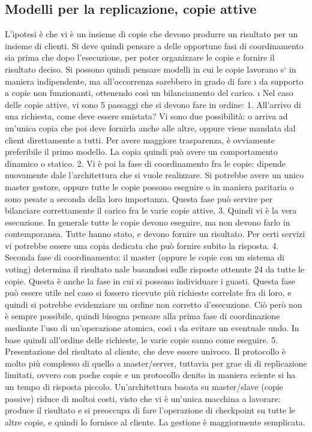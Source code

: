 \subsection{Modelli per la replicazione, copie attive}
L'ipotesi è che vi è un insieme di copie che devono produrre un risultato per
un insieme di clienti. Si deve quindi pensare a delle opportune fasi di coordinamento sia prima che dopo l'esecuzione,
per poter organizzare le copie e
fornire il risultato deciso. Si possono quindi pensare modelli in cui le copie lavorano s` in maniera indipendente, ma
all'occorrenza sarebbero in grado di fare
\i{}
da supporto a copie non funzionanti, ottenendo così un bilanciamento del carico.
\i{}
Nel caso delle copie attive, vi sono 5 passaggi che si devono fare in ordine:
1. All'arrivo di una richiesta, come deve essere smistata? Vi sono due possibilità: o arriva ad un'unica copia che poi
deve fornirla anche alle altre,
oppure viene mandata dal client direttamente a tutti. Per avere maggiore
trasparenza, è ovviamente preferibile il primo modello. La copia quindi
può avere un comportamento dinamico o statico.
2. Vi è poi la fase di coordinamento fra le copie: dipende nuovamente dale
l'architettura che si vuole realizzare. Si potrebbe avere un unico master
gestore, oppure tutte le copie possono eseguire o in maniera paritaria o
sono pesate a seconda della loro importanza. Questa fase può servire per
bilanciare correttamente il carico fra le varie copie attive.
3. Quindi vi è la vera esecuzione. In generale tutte le copie devono eseguire,
ma non devono farlo in contemporanea. Tutte hanno stato, e devono
fornire un risultato. Per certi servizi vi potrebbe essere una copia dedicata
che può fornire subito la risposta.
4. Seconda fase di coordinamento: il master (oppure le copie con un sistema
di voting) determina il risultato nale basandosi sulle risposte ottenute
24
da tutte le copie. Questa è anche la fase in cui si possono individuare i
guasti. Questa fase può essere utile nel caso si fossero ricevute più richieste
correlate fra di loro, e quindi si potrebbe evidenziare un ordine non corretto
d'esecuzione. Ciò però non è sempre possibile, quindi bisogna pensare alla
prima fase di coordinazione mediante l'uso di un'operazione atomica, così
\i{}
da evitare un eventuale undo. In base quindi all'ordine delle richieste, le
varie copie sanno come eseguire.
5. Presentazione del risultato al cliente, che deve essere univoco.
Il protocollo è molto più complesso di quello a master/server, tuttavia per grae
di di replicazione limitati, ovvero con poche copie e un protocollo denito in
maniera eciente si ha un tempo di risposta piccolo.
Un'architettura basata su master/slave (copie passive) riduce di moltoi costi,
visto che vi è un'unica macchina a lavorare: produce il risultato e si preoccupa
di fare l'operazione di checkpoint su tutte le altre copie, e quindi lo fornisce al
cliente. La gestione è maggiormente semplicata.
